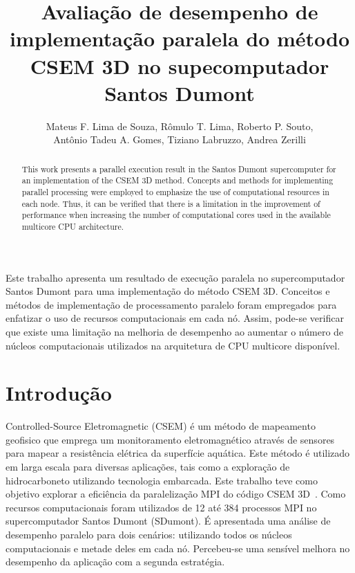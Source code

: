 \documentclass[12pt]{article}
\title{Avaliação de desempenho de implementação paralela do método CSEM 3D no supecomputador Santos Dumont}
\author{Mateus F. Lima de Souza\inst{1,2}, Rômulo T. Lima\inst{1,3}, Roberto P. Souto\inst{1}, \\ 
        Antônio Tadeu A. Gomes\inst{1}, Tiziano Labruzzo\inst{1,4}, Andrea Zerilli\inst{1,4}}
\begin{document}
 

\maketitle

\begin{abstract}
This work presents a parallel execution result in the Santos Dumont supercomputer for an implementation of the CSEM 3D method. Concepts and methods for implementing parallel processing were employed to emphasize the use of computational resources in each node. Thus, it can be verified that there is a limitation in the improvement of performance when increasing the number of computational cores used in the available multicore CPU architecture.
\end{abstract}
     
\begin{resumo} 
Este trabalho apresenta um resultado de execução paralela no supercomputador Santos Dumont para uma implementação do método CSEM 3D. Conceitos e métodos de implementação de processamento paralelo foram empregados para enfatizar o uso de recursos computacionais em cada nó. Assim, pode-se verificar que existe uma limitação na melhoria de desempenho ao aumentar o número de núcleos computacionais utilizados na arquitetura de CPU multicore disponível.
\end{resumo}

\section{Introdução}
Controlled-Source Eletromagnetic (CSEM) é um método de mapeamento geofisico que emprega um monitoramento eletromagnético através de sensores para mapear a resistência elétrica da superfície aquática. Este método é utilizado em larga escala para diversas aplicações, tais como a exploração de hidrocarboneto utilizando tecnologia embarcada. Este trabalho teve como objetivo explorar a eficiência da paralelização MPI do código CSEM 3D~\cite{zerilli2014broadband,zerilli2016broadband}. Como recursos computacionais foram utilizados de 12 até 384 processos MPI no supercomputador Santos Dumont (SDumont).  É apresentada uma análise de desempenho paralelo para dois cenários: utilizando todos os núcleos computacionais e metade deles em cada nó. Percebeu-se uma sensível melhora no desempenho da aplicação com a segunda estratégia.
\end{document}
